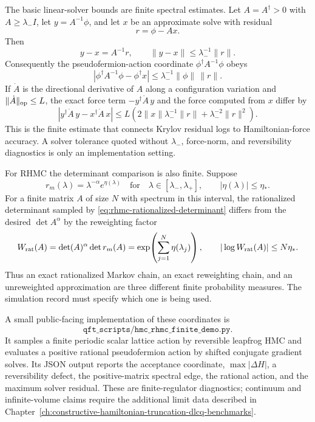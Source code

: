 The basic linear-solver bounds are finite spectral estimates.  Let
\(A=A^\dagger>0\) with \(A\geq\lambda_- I\), let \(y=A^{-1}\phi\), and let
\(x\) be an approximate solve with residual
\[
  r=\phi-Ax .
\]
Then
\[
  y-x=A^{-1}r,\qquad
  \|y-x\|\leq \lambda_-^{-1}\|r\|.
\]
Consequently the pseudofermion-action coordinate
\(\phi^\dagger A^{-1}\phi\) obeys
\begin{equation}
  \left|\phi^\dagger A^{-1}\phi-\phi^\dagger x\right|
  \leq
  \lambda_-^{-1}\|\phi\|\,\|r\|.
  \label{eq:hmc-linear-solver-action-bound}
\end{equation}
If \(\dot A\) is the directional derivative of \(A\) along a configuration
variation and \(\|\dot A\|_{\rm op}\leq L\), the exact force term
\(-y^\dagger\dot A\,y\) and the force computed from \(x\) differ by
\begin{equation}
  \left|
    y^\dagger\dot A\,y
    -
    x^\dagger\dot A\,x
  \right|
  \leq
  L\left(
    2\|x\|\lambda_-^{-1}\|r\|
    +
    \lambda_-^{-2}\|r\|^2
  \right).
  \label{eq:hmc-linear-solver-force-bound}
\end{equation}
This is the finite estimate that connects Krylov residual logs to
Hamiltonian-force accuracy.  A solver tolerance quoted without
\(\lambda_-\), force-norm, and reversibility diagnostics is only an
implementation setting.

For RHMC the determinant comparison is also finite.  Suppose
\[
  r_m(\lambda)=\lambda^{-\alpha}e^{\eta(\lambda)}
  \quad\text{for}\quad
  \lambda\in[\lambda_-,\lambda_+],
  \qquad |\eta(\lambda)|\leq\eta_* .
\]
For a finite matrix \(A\) of size \(N\) with spectrum in this interval,
the rationalized determinant sampled by
\eqref{eq:rhmc-rationalized-determinant} differs from the desired
\(\det A^\alpha\) by the reweighting factor
\begin{equation}
  W_{\rm rat}(A)
  =
  \det(A)^\alpha\det r_m(A)
  =
  \exp\!\left(\sum_{j=1}^N\eta(\lambda_j)\right),
  \qquad
  |\log W_{\rm rat}(A)|\leq N\eta_* .
  \label{eq:rhmc-determinant-reweighting-bound}
\end{equation}
Thus an exact rationalized Markov chain, an exact reweighting chain, and an
unreweighted approximation are three different finite probability measures.
The simulation record must specify which one is being used.

A small public-facing implementation of these coordinates is
\[
  \texttt{qft\_scripts/hmc\_rhmc\_finite\_demo.py}.
\]
It samples a finite periodic scalar lattice action by reversible leapfrog HMC
and evaluates a positive rational pseudofermion action by shifted conjugate
gradient solves.  Its JSON output reports the acceptance coordinate,
\(\max|\Delta H|\), a reversibility defect, the positive-matrix spectral
edge, the rational action, and the maximum solver residual.  These are
finite-regulator diagnostics; continuum and infinite-volume claims require
the additional limit data described in
Chapter~\ref{ch:constructive-hamiltonian-truncation-dlcq-benchmarks}.

